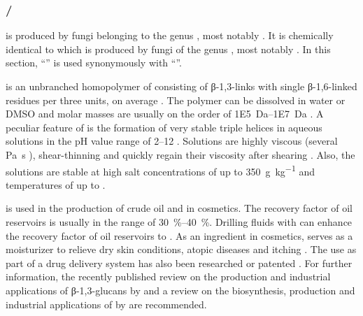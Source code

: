 \subsubsection{\SCL{}/\SHZ{}\label{subsubsec-intro-eps-commercial-shz}}
\SCL{} is produced by fungi belonging to the genus , most notably \longrolf{}. It is chemically identical to \shz{} \cite{Tabata1981} which is produced by fungi of the genus , most notably \longcomm{} \cite{Kikumoto1970}. In this section, \enquote{\scl{}} is used synonymously with \enquote{\shz{}}.

\SCL{} is an unbranched homopolymer of \glc{} consisting of β-1,3-links with single β-1,6-linked \glc{} residues per three \glc{} units, on average \cite{Kikumoto1971, Tabata1981, Rinaudo1982}. The polymer can be dissolved in water or DMSO and molar masses are usually on the order of \SIrange[retain-unity-mantissa = false]{1E5}{1E7}{\dalton} \cite{Farina2001, PatentEP_2675866_B1, PatentUS_4950749}. A peculiar feature of \scl{} is the formation of very stable triple helices in aqueous solutions in the pH value range of \numrange{2}{12} \cite{Yanaki1981, Bluhm1982, Yanaki1983a, Sato1983, Farina2001, PatentUS_20040265977}. Solutions are highly viscous (several \si{\pascal\second} \cite{PatentEP_2675866_B1}), shear-thinning and quickly regain their viscosity after shearing \cite{PatentDE_4012238}. Also, the solutions are stable at high salt concentrations of up to \SI{350}{\gram\per\kilo\gram} \cite{PatentEP_2675866_B1} and temperatures of up to  \cite{Yanaki1985, Farina2001, PatentUS_20040265977}.

\SCL{} is used in the production of crude oil and in cosmetics. The recovery factor of oil reservoirs is usually in the range of \SIrange{30}{40}{\percent}. Drilling fluids with \scl{} can enhance the recovery factor of oil reservoirs to  \cite{Davison1982, webBASF, webWintershall}. As an ingredient in cosmetics, \scl{} serves as a moisturizer to relieve dry skin conditions, atopic diseases and itching \cite{PatentAppUS20080160043}. The use as part of a drug delivery system has also been researched \cite{Coviello2005} or patented \cite{PatentUS_5215752}. For further information, the recently published review on the production and industrial applications of β-1,3-glucans by \textcite{Zhu2016} and a review on the biosynthesis, production and industrial applications of \scl{} by \textcite{Schmid2011} are recommended.


